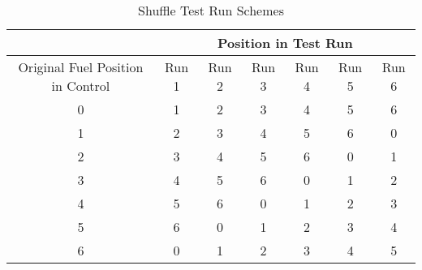 \begin{table}[h!]
\centering
\caption{Shuffle Test Run Schemes}
\begin{tabular}{ c  c  c  c  c  c  c }
 & \multicolumn{6}{c}{Position in Test Run} \\
\hline
Original Fuel Position in Control & Run 1 & Run 2 & Run 3 & Run 4 & Run 5 & Run 6  \\
\hline
0 & 1 & 2 & 3 & 4 & 5 & 6 \\
1 & 2 & 3 & 4 & 5 & 6 & 0 \\
2 & 3 & 4 & 5 & 6 & 0 & 1 \\
3 & 4 & 5 & 6 & 0 & 1 & 2 \\
4 & 5 & 6 & 0 & 1 & 2 & 3 \\
5 & 6 & 0 & 1 & 2 & 3 & 4 \\
6 & 0 & 1 & 2 & 3 & 4 & 5 \\
\hline
\end{tabular}

\label{table:shuffle}
\end{table}